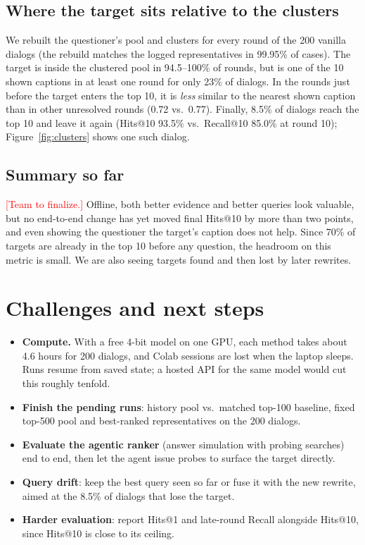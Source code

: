 \documentclass[sigconf,nonacm]{acmart}
\newcommand{\fillin}[1]{\textcolor{red}{[#1]}}
\begin{document}
\subsection{Where the target sits relative to the clusters}
\label{sec:res-diag}
We rebuilt the questioner's pool and clusters for every round of the 200 vanilla dialogs (the
rebuild matches the logged representatives in 99.95\% of cases). The target is inside the
clustered pool in 94.5--100\% of rounds, but is one of the 10 shown captions in at least one
round for only 23\% of dialogs. In the rounds just before the target enters the top 10, it is
\emph{less} similar to the nearest shown caption than in other unresolved rounds (0.72 vs.\ 0.77).
Finally, 8.5\% of dialogs reach the top 10 and leave it again (Hits@10 93.5\% vs.\ Recall@10
85.0\% at round 10); Figure~\ref{fig:clusters} shows one such dialog.



\subsection{Summary so far}
\fillin{Team to finalize.} Offline, both better evidence and better queries look valuable, but no
end-to-end change has yet moved final Hits@10 by more than two points, and even showing the
questioner the target's caption does not help. Since 70\% of targets are already in the top 10
before any question, the headroom on this metric is small. We are also seeing targets found and
then lost by later rewrites.

\section{Challenges and next steps}
\begin{itemize}
\item \textbf{Compute.} With a free 4-bit model on one GPU, each method takes about 4.6 hours for
  200 dialogs, and Colab sessions are lost when the laptop sleeps. Runs resume from saved state;
  a hosted API for the same model would cut this roughly tenfold.
\item \textbf{Finish the pending runs}: history pool vs.\ matched top-100 baseline, fixed top-500
  pool and best-ranked representatives on the 200 dialogs.
\item \textbf{Evaluate the agentic ranker} (answer simulation with probing searches) end to end,
  then let the agent issue probes to surface the target directly.
\item \textbf{Query drift}: keep the best query seen so far or fuse it with the new rewrite, aimed
  at the 8.5\% of dialogs that lose the target.
\item \textbf{Harder evaluation}: report Hits@1 and late-round Recall alongside Hits@10, since
  Hits@10 is close to its ceiling.
\end{itemize}
\end{document}
